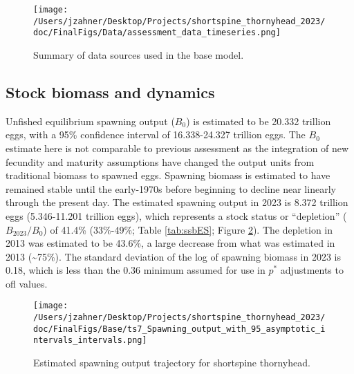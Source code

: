 \documentclass[11pt,
  english,
  letterpaper,
]{article}
\begin{document}
\begin{figure}
\centering
\texttt{[image: /Users/jzahner/Desktop/Projects/shortspine\_thornyhead\_2023/doc/FinalFigs/Data/assessment\_data\_timeseries.png]}
\caption{Summary of data sources used in the base model.\label{fig:assessment_data_timeseriesES}}
\end{figure}

\hypertarget{stock-biomass-and-dynamics}{%
\subsection*{Stock biomass and dynamics}\label{stock-biomass-and-dynamics}}

Unfished equilibrium spawning output (\(B_0\)) is estimated to be 20.332 trillion eggs, with a 95\% confidence interval of 16.338-24.327 trillion eggs. The \(B_0\) estimate here is not comparable to previous assessment as the integration of new fecundity and maturity assumptions have changed the output units from traditional biomass to spawned eggs. Spawning biomass is estimated to have remained stable until the early-1970s before beginning to decline near linearly through the present day. The estimated spawning output in 2023 is 8.372 trillion eggs (5.346-11.201 trillion eggs), which represents a stock status or ``depletion'' (\(B_{2023}/B_0\)) of 41.4\% (33\%-49\%; Table \ref{tab:ssbES}; Figure \ref{fig:ssb_trajectoryES}). The depletion in 2013 was estimated to be 43.6\%, a large decrease from what was estimated in 2013 (\textasciitilde75\%). The standard deviation of the log of spawning biomass in 2023 is 0.18, which is less than the 0.36 minimum assumed for use in \(p^*\) adjustments to \gls{ofl} values.

\begin{figure}
\centering
\texttt{[image: /Users/jzahner/Desktop/Projects/shortspine\_thornyhead\_2023/doc/FinalFigs/Base/ts7\_Spawning\_output\_with\_95\_asymptotic\_intervals\_intervals.png]}
\caption{Estimated spawning output trajectory for shortspine thornyhead.\label{fig:ssb_trajectoryES}}
\end{figure}

\begingroup\fontsize{10}{12}\selectfont
\begingroup\fontsize{10}{12}\selectfont
\end{document}

